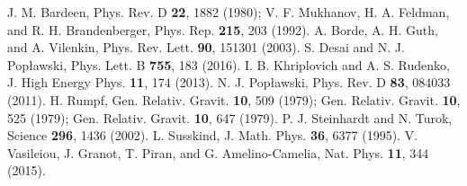 \documentclass[prd,onecolumn,nofootinbib]{revtex4}
\begin{document}
\begin{thebibliography}{}
 J. M. Bardeen, Phys. Rev. D {\bf 22}, 1882 (1980); V. F. Mukhanov, H. A. Feldman, and R. H. Brandenberger, Phys. Rep. {\bf 215}, 203 (1992).
 A. Borde, A. H. Guth, and A. Vilenkin, Phys. Rev. Lett. {\bf 90}, 151301 (2003).
 S. Desai and N. J. Pop{\l}awski, Phys. Lett. B {\bf 755}, 183 (2016).
 I. B. Khriplovich and A. S. Rudenko, J. High Energy Phys. {\bf 11}, 174 (2013).
 N. J. Pop{\l}awski, Phys. Rev. D {\bf 83}, 084033 (2011).
 H. Rumpf, Gen. Relativ. Gravit. {\bf 10}, 509 (1979); Gen. Relativ. Gravit. {\bf 10}, 525 (1979); Gen. Relativ. Gravit. {\bf 10}, 647 (1979).
 P. J. Steinhardt and N. Turok, Science {\bf 296}, 1436 (2002).
 L. Susskind, J. Math. Phys. {\bf 36}, 6377 (1995).
 V. Vasileiou, J. Granot, T. Piran, and G. Amelino-Camelia, Nat. Phys. {\bf 11}, 344 (2015).
\end{thebibliography}
\end{document}
